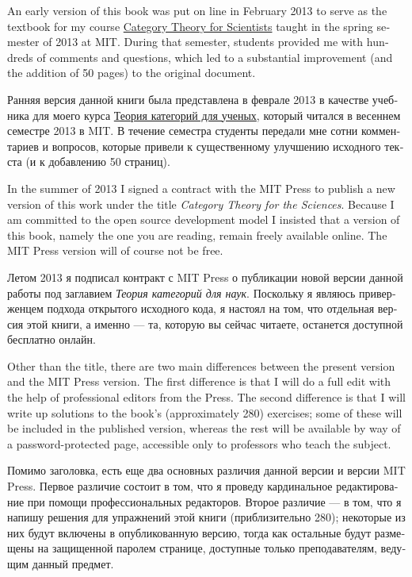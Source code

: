 \documentclass[a4paper]{book}
\theoremstyle{myth}
\begin{document}
\begin{english}
An early version of this book was put on line in February 2013 to serve as the textbook for my course \href{http://math.mit.edu/~dspivak/teaching/sp13/}{\text Category Theory for Scientists} taught in the spring semester of 2013 at MIT. During that semester, students provided me with hundreds of comments and questions, which led to a substantial improvement (and the addition of 50 pages) to the original document.

\begin{russian}Ранняя версия данной книги была представлена в феврале 2013 в качестве учебника для моего курса \href{http://math.mit.edu/~dspivak/teaching/sp13/}{\text Теория категорий для ученых}, который читался в весеннем семестре 2013 в MIT. В течение семестра студенты передали мне сотни комментариев и вопросов, которые привели к существенному улучшению исходного текста (и к добавлению 50 страниц).\end{russian}

In the summer of 2013 I signed a contract with the MIT Press to publish a new version of this work under the title {\em Category Theory for the Sciences}. Because I am committed to the open source development model I insisted that a version of this book, namely the one you are reading, remain freely available online. The MIT Press version will of course not be free.

\begin{russian}Летом 2013 я подписал контракт с MIT Press о публикации новой версии данной работы под заглавием {\em Теория категорий для наук}. Поскольку я являюсь приверженцем подхода открытого исходного кода, я настоял на том, что отдельная версия этой книги, а именно — та, которую вы сейчас читаете, останется доступной бесплатно онлайн. \end{russian}

Other than the title, there are two main differences between the present version and the MIT Press version. The first difference is that I will do a full edit with the help of professional editors from the Press. The second difference is that I will write up solutions to the book's (approximately 280) exercises; some of these will be included in the published version, whereas the rest will be available by way of a password-protected page, accessible only to professors who teach the subject.

\begin{russian}Помимо заголовка, есть еще два основных различия данной версии и версии MIT Press. Первое различие состоит в том, что я проведу кардинальное редактирование при помощи профессиональных редакторов. Второе различие — в том, что я напишу решения для упражнений этой книги (приблизительно 280); некоторые из них будут включены в опубликованную версию, тогда как остальные будут размещены на защищенной паролем странице, доступные только преподавателям, ведущим данный предмет. \end{russian}


\end{english}
\end{document}
